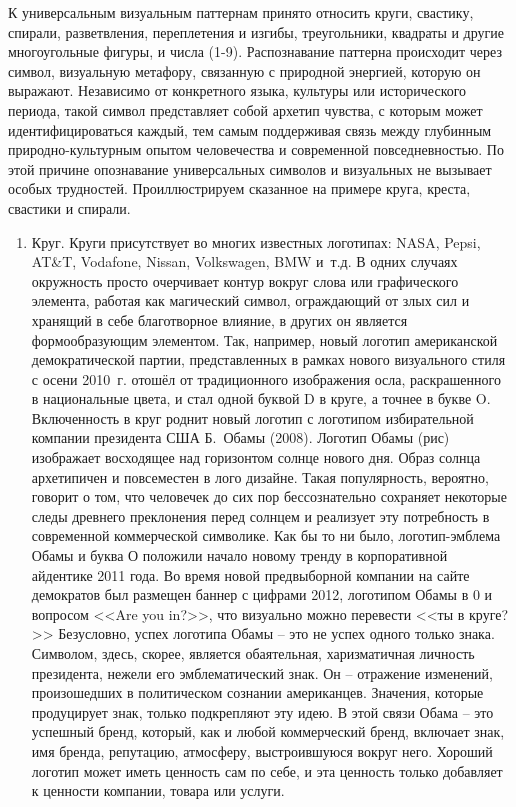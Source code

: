 К универсальным визуальным паттернам принято относить  круги, свастику, спирали,
разветвления, переплетения и изгибы, треугольники, квадраты и другие многоугольные
фигуры, и числа (1-9). Распознавание паттерна происходит через символ, визуальную
метафору, связанную с природной энергией, которую он выражают. Независимо от
конкретного языка, культуры или исторического периода, такой символ представляет
собой архетип чувства, с которым может идентифицироваться каждый, тем самым
поддерживая связь между глубинным природно-культурным опытом человечества и
современной повседневностью. По этой причине опознавание универсальных символов
и визуальных не вызывает особых трудностей. Проиллюстрируем сказанное на примере
круга, креста, свастики и спирали.
\begin{enumerate}
\item Круг. Круги присутствует во многих известных логотипах: NASA, Pepsi,
  AT\&T, Vodafone, Nissan, Volkswagen, BMW и~т.д. В одних случаях окружность
  просто очерчивает контур вокруг слова или графического элемента, работая
  как магический символ, ограждающий от злых сил и хранящий в себе благотворное
  влияние, в других он является формообразующим элементом. Так, например, новый
  логотип американской демократической партии, представленных в рамках нового
  визуального стиля с осени 2010~г. отошёл от традиционного изображения осла,
  раскрашенного в национальные цвета, и стал одной буквой D в круге, а точнее
  в букве O. Включенность в круг роднит новый логотип с логотипом
  избирательной компании президента США Б.~Обамы (2008). Логотип Обамы (рис) %
  изображает восходящее над горизонтом солнце нового дня. Образ солнца архетипичен
  и повсеместен в лого дизайне. Такая популярность, вероятно, говорит о том,
  что человечек до сих пор бессознательно сохраняет некоторые следы древнего
  преклонения перед солнцем и реализует эту потребность в современной
  коммерческой символике. Как бы то ни было, логотип-эмблема Обамы и буква О
  положили начало новому тренду в корпоративной айдентике 2011 года.
  Во время новой предвыборной компании на сайте демократов был размещен
  баннер с цифрами 2012, логотипом Обамы в 0 и вопросом <<Are you in?>>,
  что визуально можно перевести <<ты в круге?>> Безусловно, успех логотипа
  Обамы -- это не успех одного только знака. Символом, здесь, скорее,
  является обаятельная, харизматичная личность президента, нежели его
  эмблематический знак. Он -- отражение изменений, произошедших в политическом
  сознании американцев. Значения, которые продуцирует знак, только подкрепляют
  эту идею. В этой связи Обама -- это успешный бренд, который, как и любой
  коммерческий бренд, включает знак, имя бренда, репутацию, атмосферу,
  выстроившуюся вокруг него. Хороший логотип может иметь ценность сам по себе,
  и эта ценность только добавляет к ценности компании, товара или услуги.


\end{enumerate}
